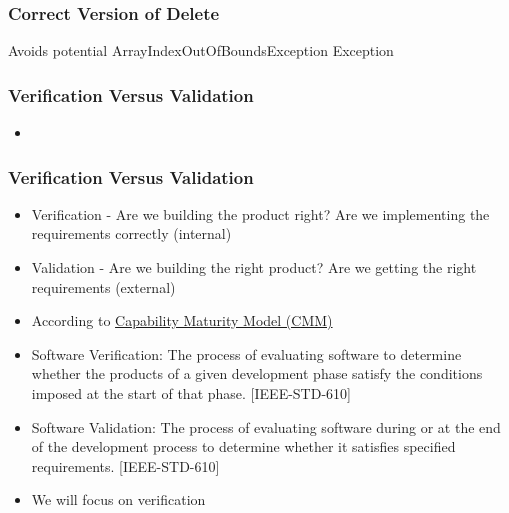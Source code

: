\documentclass[t,12pt,numbers,fleqn]{beamer}
\begin{document}

\begin{frame}
\frametitle{Correct Version of Delete}

\lstset{language=java,breaklines=true,showspaces=false,showstringspaces=false,breakatwhitespace=true}
\noindent 

Avoids potential ArrayIndexOutOfBoundsException Exception

\end{frame}


\begin{frame}
\frametitle{Verification Versus Validation}

\begin{itemize}

\item {}

\end{itemize}

\end{frame}


\begin{frame}
\frametitle{Verification Versus Validation}

\begin{itemize}

\item Verification - Are we building the product right?  Are we implementing the
  requirements correctly (internal)
\item Validation - Are we building the right product? Are we getting the right
  requirements (external)
\item According to
  \href{https://en.wikipedia.org/wiki/Software_verification_and_validation}{Capability
    Maturity Model (CMM)}
\bi
\item 
    Software Verification: The process of evaluating software to determine
    whether the products of a given development phase satisfy the conditions
    imposed at the start of that phase. [IEEE-STD-610]
  \item Software Validation: The process of evaluating software during or at the
    end of the development process to determine whether it satisfies specified
    requirements. [IEEE-STD-610] 
\ei
\item We will focus on verification
\end{itemize}

\end{frame}
\end{document}

